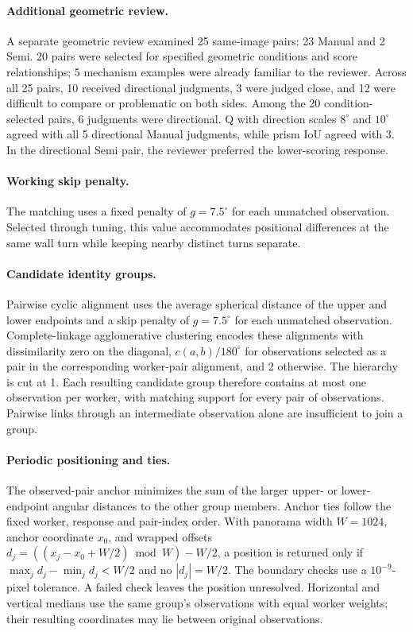 \paragraph{Additional geometric review.}
A separate geometric review examined 25 same-image pairs: 23 Manual and 2 Semi. 20 pairs were selected for specified geometric conditions and score relationships; 5 mechanism examples were already familiar to the reviewer. Across all 25 pairs, 10 received directional judgments, 3 were judged close, and 12 were difficult to compare or problematic on both sides. Among the 20 condition-selected pairs, 6 judgments were directional. Q with direction scales \(8^\circ\) and \(10^\circ\) agreed with all 5 directional Manual judgments, while prism IoU agreed with 3. In the directional Semi pair, the reviewer preferred the lower-scoring response.

\paragraph{Working skip penalty.}
The matching uses a fixed penalty of \(g=7.5^\circ\) for each unmatched observation. Selected through tuning, this value accommodates positional differences at the same wall turn while keeping nearby distinct turns separate.

\paragraph{Candidate identity groups.}
Pairwise cyclic alignment uses the average spherical distance of the upper
and lower endpoints and a skip penalty of \(g=7.5^\circ\) for each unmatched
observation. Complete-linkage agglomerative clustering encodes these
alignments with dissimilarity zero on the diagonal, \(c(a,b)/180^\circ\) for
observations selected as a pair in the corresponding worker-pair alignment,
and 2 otherwise. The hierarchy is cut at 1. Each resulting candidate group
therefore contains at most one observation per worker, with matching support
for every pair of observations. Pairwise links through an intermediate
observation alone are insufficient to join a group.

\paragraph{Periodic positioning and ties.}
The observed-pair anchor minimizes the sum of the larger upper- or
lower-endpoint angular distances to the other group members. Anchor ties
follow the fixed worker, response and pair-index order. With panorama
width \(W=1024\), anchor coordinate \(x_0\), and wrapped offsets
\(d_j=((x_j-x_0+W/2)\bmod W)-W/2\), a position is returned only if
\(\max_j d_j-\min_j d_j<W/2\) and no \(|d_j|=W/2\). The boundary checks
use a \(10^{-9}\)-pixel tolerance. A failed check leaves the position
unresolved. Horizontal and vertical medians use the same group's
observations with equal worker weights; their resulting coordinates may
lie between original observations.

